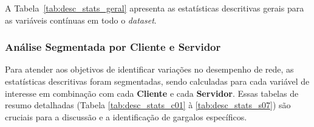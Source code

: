 \documentclass{article}
\begin{document}
A Tabela~\ref{tab:desc_stats_geral} apresenta as estatísticas descritivas gerais para as variáveis contínuas em todo o \textit{dataset}.

\begin{table}[htp]
	\centering
	\caption{Estatísticas descritivas gerais das variáveis contínuas.}
	\label{tab:desc_stats_geral} %
\end{table}

\subsubsection{Análise Segmentada por Cliente e Servidor}

Para atender aos objetivos de identificar variações no desempenho de rede, as estatísticas descritivas foram segmentadas, sendo calculadas para cada variável de interesse em combinação com cada \textbf{Cliente} e cada \textbf{Servidor}. Essas tabelas de resumo detalhadas (Tabela \ref{tab:desc_stats_c01} à \ref{tab:desc_stats_s07}) são cruciais para a discussão e a identificação de gargalos específicos.
\end{document}
